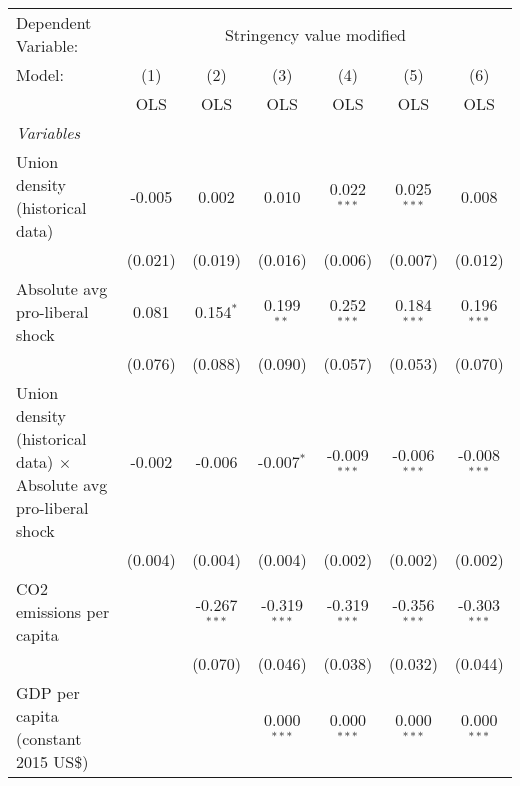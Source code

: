 
\begingroup
\centering
\begin{tabular}{lcccccc}
   \toprule
   Dependent Variable: & \multicolumn{6}{c}{Stringency value modified}\\
   Model:                                                                   & (1)     & (2)            & (3)            & (4)            & (5)            & (6)\\  
                                                                            &  OLS    & OLS            & OLS            & OLS            & OLS            & OLS\\  
   \midrule
   \emph{Variables}\\
   Union density (historical data)                                          & -0.005  & 0.002          & 0.010          & 0.022$^{***}$  & 0.025$^{***}$  & 0.008\\   
                                                                            & (0.021) & (0.019)        & (0.016)        & (0.006)        & (0.007)        & (0.012)\\   
   Absolute avg pro-liberal shock                                           & 0.081   & 0.154$^{*}$    & 0.199$^{**}$   & 0.252$^{***}$  & 0.184$^{***}$  & 0.196$^{***}$\\   
                                                                            & (0.076) & (0.088)        & (0.090)        & (0.057)        & (0.053)        & (0.070)\\   
   Union density (historical data) $\times$ Absolute avg pro-liberal shock  & -0.002  & -0.006         & -0.007$^{*}$   & -0.009$^{***}$ & -0.006$^{***}$ & -0.008$^{***}$\\   
                                                                            & (0.004) & (0.004)        & (0.004)        & (0.002)        & (0.002)        & (0.002)\\   
   CO2 emissions per capita                                                 &         & -0.267$^{***}$ & -0.319$^{***}$ & -0.319$^{***}$ & -0.356$^{***}$ & -0.303$^{***}$\\   
                                                                            &         & (0.070)        & (0.046)        & (0.038)        & (0.032)        & (0.044)\\   
   GDP per capita (constant 2015 US\$)                                      &         &                & 0.000$^{***}$  & 0.000$^{***}$  & 0.000$^{***}$  & 0.000$^{***}$\\   

\end{tabular}
